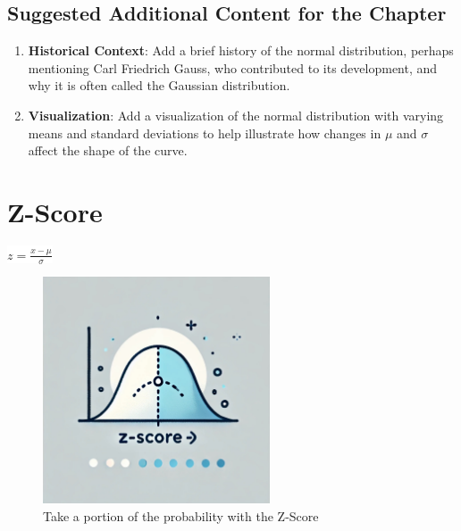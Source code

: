 \documentclass[
  12 pt,
  a4paper,
]{book}
\numberwithin{equation}{section}
\theoremstyle{plain}      %
\theoremstyle{definition} %
\theoremstyle{remark}     %
\theoremstyle{note}         %
\begin{document}
\hypertarget{suggested-additional-content-for-the-chapter}{%
\section{Suggested Additional Content for the
Chapter}\label{suggested-additional-content-for-the-chapter}}

\begin{enumerate}
\def\labelenumi{\arabic{enumi}.}
\item
  \textbf{Historical Context}: Add a brief history of the normal
  distribution, perhaps mentioning Carl Friedrich Gauss, who contributed
  to its development, and why it is often called the Gaussian
  distribution.
\item
  \textbf{Visualization}: Add a visualization of the normal distribution
  with varying means and standard deviations to help illustrate how
  changes in \(\mu\) and \(\sigma\) affect the shape of the curve.
\end{enumerate}

\newpage

\hypertarget{z-score}{%
\chapter{Z-Score}\label{z-score}}

\begin{center}
\colorbox{white}{\color{navyimpactblue} \huge $z = \frac{x - \mu}{\sigma}$}
\end{center}

\hfill\break

\begin{figure}[h!]
  \begin{center}
    \includegraphics[width=0.6\textwidth]{pictures/Whimsical-3-Zscore.jpeg}
    \caption*{\Large Take a portion of the probability with the Z-Score}
  \end{center}
\end{figure}
\end{document}
